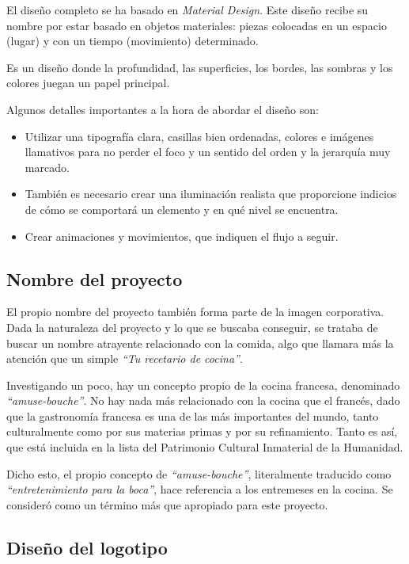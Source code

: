 El diseño completo se ha basado en
\textit{Material Design}.\cite{material-design} Este diseño recibe su nombre por
estar basado en objetos materiales: piezas colocadas en un espacio (lugar) y con
un tiempo (movimiento) determinado.

Es un diseño donde la profundidad, las superficies, los bordes, las sombras y
los colores juegan un papel principal.

Algunos detalles importantes a la hora de abordar el diseño son:
\begin{itemize}
\item Utilizar una tipografía clara, casillas bien ordenadas, colores e
  imágenes llamativos para no perder el foco y un sentido del orden y la
  jerarquía muy marcado.
\item También es necesario crear una iluminación realista que proporcione
  indicios de cómo se comportará un elemento y en qué nivel se encuentra.
\item Crear animaciones y movimientos, que indiquen el flujo a seguir.
\end{itemize}


\subsection{Nombre del proyecto}

El propio nombre del proyecto también forma parte de la imagen corporativa. Dada
la naturaleza del proyecto y lo que se buscaba conseguir, se trataba de buscar
un nombre atrayente relacionado con la comida, algo que llamara más la atención
que un simple \textit{``Tu recetario de cocina''}.

Investigando un poco, hay un concepto propio de la cocina
francesa,\cite{gastronomia-francia} denominado \textit{``amuse-bouche''}. No hay
nada más relacionado con la cocina que el francés, dado que la gastronomía
francesa es una de las más importantes del mundo, tanto culturalmente como por
sus materias primas y por su refinamiento. Tanto es así, que está incluida en la
lista del Patrimonio Cultural Inmaterial de la Humanidad.

Dicho esto, el propio concepto de \textit{``amuse-bouche''}, literalmente
traducido como \textit{``entretenimiento para la boca''},\cite{amuse-bouche}
hace referencia a los entremeses en la cocina. Se consideró como un término más
que apropiado para este proyecto.


\subsection{Diseño del logotipo}

